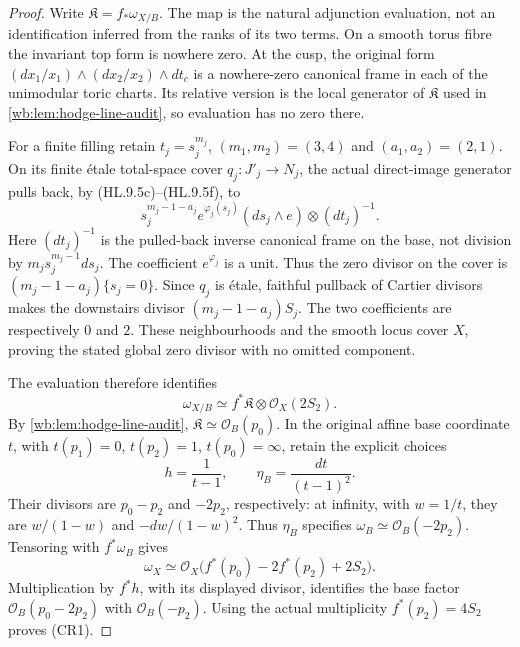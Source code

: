 \begin{proof}
Write $\mathfrak K=f_*\omega_{X/B}$. The map is the natural adjunction
evaluation, not an identification inferred from the ranks of its two
terms. On a smooth torus fibre the invariant top form is nowhere zero.
At the cusp, the original form
$(dx_1/x_1)\wedge(dx_2/x_2)\wedge dt_c$ is a nowhere-zero canonical
frame in each of the unimodular toric charts. Its relative version is
the local generator of $\mathfrak K$ used in
\cref{wb:lem:hodge-line-audit}, so evaluation has no zero there.

For a finite filling retain $t_j=s_j^{m_j}$,
$(m_1,m_2)=(3,4)$ and $(a_1,a_2)=(2,1)$. On its finite \'etale
total-space cover $q_j:J'_j\to N_j$, the actual direct-image generator
pulls back, by (HL.9.5c)--(HL.9.5f), to
\[
 s_j^{m_j-1-a_j}e^{\varphi_j(s_j)}
       (ds_j\wedge e)\otimes(dt_j)^{-1}.
 \tag{CR5}
\]
Here $(dt_j)^{-1}$ is the pulled-back inverse canonical frame on the
base, not division by $m_js_j^{m_j-1}ds_j$. The coefficient
$e^{\varphi_j}$ is a unit. Thus the zero divisor on the cover is
$(m_j-1-a_j)\{s_j=0\}$. Since $q_j$ is \'etale, faithful pullback
of Cartier divisors makes the downstairs divisor
$(m_j-1-a_j)S_j$. The two coefficients are respectively $0$ and $2$.
These neighbourhoods and the smooth locus cover $X$, proving the stated
global zero divisor with no omitted component.

The evaluation therefore identifies
\[
 \omega_{X/B}\simeq f^*\mathfrak K\otimes\mathcal O_X(2S_2).
\]
By \cref{wb:lem:hodge-line-audit}, $\mathfrak K\simeq\mathcal O_B(p_0)$.
In the original affine base coordinate $t$, with
$t(p_1)=0$, $t(p_2)=1$, $t(p_0)=\infty$, retain the explicit choices
\[
 h=\frac1{t-1},\qquad \eta_B=\frac{dt}{(t-1)^2}.
\]
Their divisors are $p_0-p_2$ and $-2p_2$, respectively: at infinity,
with $w=1/t$, they are $w/(1-w)$ and $-dw/(1-w)^2$.
Thus $\eta_B$ specifies $\omega_B\simeq\mathcal O_B(-2p_2)$.
Tensoring with $f^*\omega_B$ gives
\[
 \omega_X\simeq
 \mathcal O_X\bigl(f^*(p_0)-2f^*(p_2)+2S_2\bigr).
\]
Multiplication by $f^*h$, with its displayed divisor, identifies the
base factor $\mathcal O_B(p_0-2p_2)$ with $\mathcal O_B(-p_2)$.
Using the actual multiplicity $f^*(p_2)=4S_2$ proves (CR1).


\end{proof}
